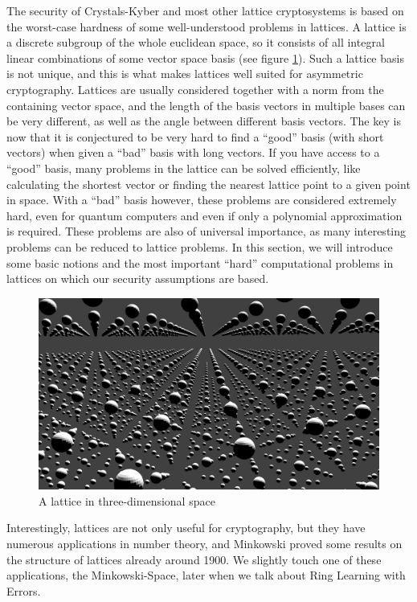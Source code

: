 \documentclass{report}
\begin{document}
\motivation
The security of Crystals-Kyber and most other lattice cryptosystems is based on the worst-case hardness of some well-understood problems in lattices. A lattice is a discrete subgroup of the whole euclidean space, so it consists of all integral linear combinations of some vector space basis (see figure \ref{lattice_graphic}). Such a lattice basis is not unique, and this is what makes lattices well suited for asymmetric cryptography. Lattices are usually considered together with a norm from the containing vector space, and the length of the basis vectors in multiple bases can be very different, as well as the angle between different basis vectors. The key is now that it is conjectured to be very hard to find a ``good'' basis (with short vectors) when given a ``bad'' basis with long vectors. If you have access to a ``good'' basis, many problems in the lattice can be solved efficiently, like calculating the shortest vector or finding the nearest lattice point to a given point in space. With a ``bad'' basis however, these problems are considered extremely hard, even for quantum computers and even if only a polynomial approximation is required. These problems are also of universal importance, as many interesting problems can be reduced to lattice problems. In this section, we will introduce some basic notions and the most important ``hard'' computational problems in lattices on which our security assumptions are based.

\begin{figure}[ht]
\centering
\includegraphics[width=\textwidth]{lattice.png}
\caption{A lattice in three-dimensional space}
\label{lattice_graphic}
\end{figure}

Interestingly, lattices are not only useful for cryptography, but they have numerous applications in number theory, and Minkowski proved some results on the structure of lattices already around 1900. We slightly touch one of these applications, the Minkowski-Space, later when we talk about Ring Learning with Errors.
\end{document}
